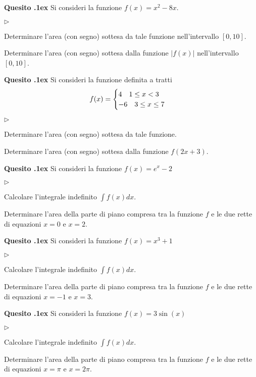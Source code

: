 \documentclass[11pt,twoside,a4paper]{article}
\newcommand{\mylabel}[1]{#1\hfill}
\renewenvironment{itemize}
  {\begin{list}{$\triangleright$}{%
   \setlength{\parskip}{0mm}
   \setlength{\topsep}{.4\baselineskip}
   \setlength{\rightmargin}{0mm}
   \setlength{\listparindent}{0mm}
   \setlength{\itemindent}{0mm}
   \setlength{\labelwidth}{2ex}
   \setlength{\itemsep}{.4\baselineskip}
   \setlength{\parsep}{0mm}
   \setlength{\partopsep}{0mm}
   \setlength{\labelsep}{1ex}
   \setlength{\leftmargin}{\labelwidth+\labelsep}
   \let\makelabel\mylabel}}{%
   \end{list}\vspace*{-1.3mm}}
\newcounter{quesito}
\newenvironment{question}{\bigskip\addtocounter{quesito}{1}\bigskip\bigskip\par\textbf{Quesito \thequesito.\kern1ex}}{\vspace{\parskip}}
\begin{document}
\begin{question}
Si consideri la funzione $f(x) = x^2 - 8x$.
\begin{itemize}
\item[1.] Determinare l'area (con segno) sottesa da tale funzione nell'intervallo $[0, 10]$.
\item[2.] Determinare l'area (con segno) sottesa dalla funzione $\lvert f(x) \rvert$ nell'intervallo $[0, 10]$.
\end{itemize}
\end{question}
\begin{question}
Si consideri la funzione definita a tratti 
\[f(x) = \begin{cases} 4 \quad 1 \leq x < 3 \cr -6 \quad 3 \leq x \leq 7 \end{cases}\]
\begin{itemize}
\item[1.] Determinare l'area (con segno) sottesa da tale funzione.
\item[2.] Determinare l'area (con segno) sottesa dalla funzione $f(2x + 3)$.
\end{itemize}
\end{question}
\begin{question}
Si consideri la funzione $f(x) = e^x - 2$
\begin{itemize}
\item[1.] Calcolare l'integrale indefinito $\displaystyle \int f(x) dx$.
\item[2.] Determinare l'area della parte di piano compresa tra la funzione $f$ e le due rette di equazioni $x = 0$ e $x = 2$.
\end{itemize}
\end{question}
\begin{question}
Si consideri la funzione $f(x) = x^3 + 1$
\begin{itemize}
\item[1.] Calcolare l'integrale indefinito $\displaystyle \int f(x) dx$.
\item[2.] Determinare l'area della parte di piano compresa tra la funzione $f$ e le due rette di equazioni $x = -1$ e $x = 3$.
\end{itemize}
\end{question}
\begin{question}
Si consideri la funzione $f(x) = 3\sin(x)$
\begin{itemize}
\item[1.] Calcolare l'integrale indefinito $\displaystyle \int f(x) dx$.
\item[2.] Determinare l'area della parte di piano compresa tra la funzione $f$ e le due rette di equazioni $x = \pi$ e $x = 2 \pi$.
\end{itemize}
\end{question}
\end{document}

